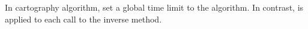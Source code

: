 In cartography algorithm, set a global time limit to the algorithm.
In contrast,  is applied to each call to the inverse method.


%
%
%
%
%


